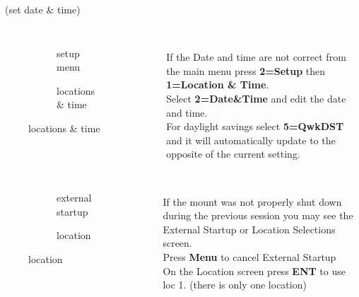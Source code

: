 \begin{frame}[t]{\insertsubsectionhead\ (set date \& time)}
  \begin{columns}[T]
  \begin{figure}[ht]
    \begin{subfigure}{0.67\textwidth}
    \caption{setup menu}
  \end{subfigure}
  \vspace{\fill}
  \begin{subfigure}{0.67\textwidth}
    \caption{locations \& time}
  \end{subfigure}
\end{figure}
  \large
  \ \\[0.25ex]
  If the Date and time are not correct from the main menu press \textbf{2=Setup}
  then \textbf{1=Location \& Time}.\\[1ex]

  Select \textbf{2=Date\&Time} and edit the date and time.\\[1ex]
  
  For daylight savings  select \textbf{5=QwkDST} and it will automatically update
  to the opposite  of the current setting.
\end{columns}
\end{frame}
\begin{frame}[t]{\insertsubsectionhead}
    \begin{columns}[T]
    \begin{figure}[ht]
      \begin{subfigure}{0.67\textwidth}
      \caption{external startup}
    \end{subfigure}
    \vspace{\fill}
    \begin{subfigure}{0.67\textwidth}
      \caption{location}
    \end{subfigure}
  \end{figure}
    \large
    \ \\[0.25ex]
    If the mount was not properly shut down during the previous session you may
    see the External Startup or Location Selections screen.\\[1ex]

    Press \textbf{Menu} to cancel External Startup\\[1ex]

    On the Location screen press \textbf{ENT} to use loc 1.
    (there is only one location)

  \end{columns}
\end{frame}

